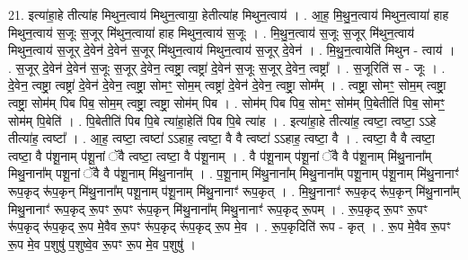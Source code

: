 \documentclass[17pt]{extarticle}
\begin{document}
21. इत्या॑हा॒हे तीत्या॑ह मिथुन॒त्वाय॑ मिथुन॒त्वाया॒ हेतीत्या॑ह मिथुन॒त्वाय॑ । . आ॒ह॒ मि॒थु॒न॒त्वाय॑ मिथुन॒त्वाया॑ हाह मिथुन॒त्वाय॑ स॒जूः स॒जूर् मि॑थुन॒त्वाया॑ हाह मिथुन॒त्वाय॑ स॒जूः । . मि॒थु॒न॒त्वाय॑ स॒जूः स॒जूर् मि॑थुन॒त्वाय॑ मिथुन॒त्वाय॑ स॒जूर् दे॒वेन॑ दे॒वेन॑ स॒जूर् मि॑थुन॒त्वाय॑ मिथुन॒त्वाय॑ स॒जूर् दे॒वेन॑ । . मि॒थु॒न॒त्वायेति॑ मिथुन - त्वाय॑ । . स॒जूर् दे॒वेन॑ दे॒वेन॑ स॒जूः स॒जूर् दे॒वेन॒ त्वष्ट्रा॒ त्वष्ट्रा॑ दे॒वेन॑ स॒जूः स॒जूर् दे॒वेन॒ त्वष्ट्रा᳚ । . स॒जूरिति॑ स - जूः । . दे॒वेन॒ त्वष्ट्रा॒ त्वष्ट्रा॑ दे॒वेन॑ दे॒वेन॒ त्वष्ट्रा॒ सोमꣳ॒॒ सोम॒म् त्वष्ट्रा॑ दे॒वेन॑ दे॒वेन॒ त्वष्ट्रा॒ सोम᳚म् । . त्वष्ट्रा॒ सोमꣳ॒॒ सोम॒म् त्वष्ट्रा॒ त्वष्ट्रा॒ सोम॑म् पिब पिब॒ सोम॒म् त्वष्ट्रा॒ त्वष्ट्रा॒ सोम॑म् पिब । . सोम॑म् पिब पिब॒ सोमꣳ॒॒ सोम॑म् पि॒बेतीति॑ पिब॒ सोमꣳ॒॒ सोम॑म् पि॒बेति॑ । . पि॒बेतीति॑ पिब पि॒बे त्या॑हा॒हेति॑ पिब पि॒बे त्या॑ह । . इत्या॑हा॒हे तीत्या॑ह॒ त्वष्टा॒ त्वष्टा॒ ऽऽहे तीत्या॑ह॒ त्वष्टा᳚ । . आ॒ह॒ त्वष्टा॒ त्वष्टा॑ ऽऽहाह॒ त्वष्टा॒ वै वै त्वष्टा॑ ऽऽहाह॒ त्वष्टा॒ वै । . त्वष्टा॒ वै वै त्वष्टा॒ त्वष्टा॒ वै प॑शू॒नाम् प॑शू॒नां ॅवै त्वष्टा॒ त्वष्टा॒ वै प॑शू॒नाम् । . वै प॑शू॒नाम् प॑शू॒नां ॅवै वै प॑शू॒नाम् मि॑थु॒नाना᳚म् मिथु॒नाना᳚म् पशू॒नां ॅवै वै प॑शू॒नाम् मि॑थु॒नाना᳚म् । . प॒शू॒नाम् मि॑थु॒नाना᳚म् मिथु॒नाना᳚म् पशू॒नाम् प॑शू॒नाम् मि॑थु॒नानाꣳ॑ रूप॒कृद् रू॑प॒कृन् मि॑थु॒नाना᳚म् पशू॒नाम् प॑शू॒नाम् मि॑थु॒नानाꣳ॑ रूप॒कृत् । . मि॒थु॒नानाꣳ॑ रूप॒कृद् रू॑प॒कृन् मि॑थु॒नाना᳚म् मिथु॒नानाꣳ॑ रूप॒कृद् रू॒पꣳ रू॒पꣳ रू॑प॒कृन् मि॑थु॒नाना᳚म् मिथु॒नानाꣳ॑ रूप॒कृद् रू॒पम् । . रू॒प॒कृद् रू॒पꣳ रू॒पꣳ रू॑प॒कृद् रू॑प॒कृद् रू॒प मे॒वैव रू॒पꣳ रू॑प॒कृद् रू॑प॒कृद् रू॒प मे॒व । . रू॒प॒कृदिति॑ रूप - कृत् । . रू॒प मे॒वैव रू॒पꣳ रू॒प मे॒व प॒शुषु॑ प॒शुष्वे॒व रू॒पꣳ रू॒प मे॒व प॒शुषु॑ । \newline
\end{document}
